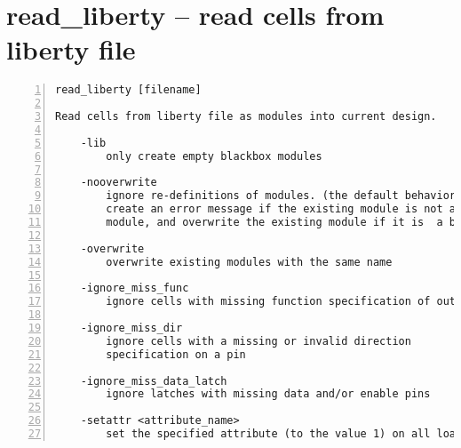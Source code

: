 \section{read\_liberty -- read cells from liberty file}
\label{cmd:read_liberty}
\begin{lstlisting}[numbers=left,frame=single]
    read_liberty [filename]

Read cells from liberty file as modules into current design.

    -lib
        only create empty blackbox modules

    -nooverwrite
        ignore re-definitions of modules. (the default behavior is to
        create an error message if the existing module is not a blackbox
        module, and overwrite the existing module if it is  a blackbox module.)

    -overwrite
        overwrite existing modules with the same name

    -ignore_miss_func
        ignore cells with missing function specification of outputs

    -ignore_miss_dir
        ignore cells with a missing or invalid direction
        specification on a pin

    -ignore_miss_data_latch
        ignore latches with missing data and/or enable pins

    -setattr <attribute_name>
        set the specified attribute (to the value 1) on all loaded modules
\end{lstlisting}

